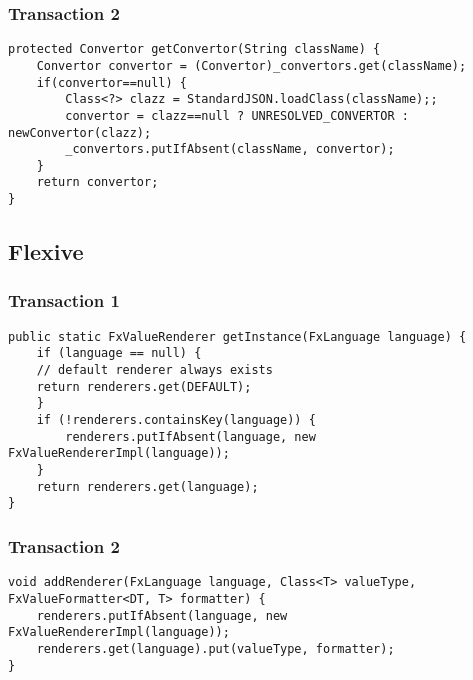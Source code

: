%
%
%

\subsubsection{Transaction 2}
\begin{lstlisting}
protected Convertor getConvertor(String className) {
	Convertor convertor = (Convertor)_convertors.get(className);
	if(convertor==null) {
		Class<?> clazz = StandardJSON.loadClass(className);;
		convertor = clazz==null ? UNRESOLVED_CONVERTOR : newConvertor(clazz);
		_convertors.putIfAbsent(className, convertor);
	}
	return convertor;
}
\end{lstlisting}


%
%
%

\subsection{Flexive}

\subsubsection{Transaction 1}
\begin{lstlisting}
public static FxValueRenderer getInstance(FxLanguage language) {
	if (language == null) {
	// default renderer always exists
	return renderers.get(DEFAULT);
	}
	if (!renderers.containsKey(language)) {
		renderers.putIfAbsent(language, new FxValueRendererImpl(language));
	}
	return renderers.get(language);
}
\end{lstlisting}

%
%
%
%

\subsubsection{Transaction 2}
\begin{lstlisting}
void addRenderer(FxLanguage language, Class<T> valueType, FxValueFormatter<DT, T> formatter) {
	renderers.putIfAbsent(language, new FxValueRendererImpl(language));
	renderers.get(language).put(valueType, formatter);
}
\end{lstlisting}

